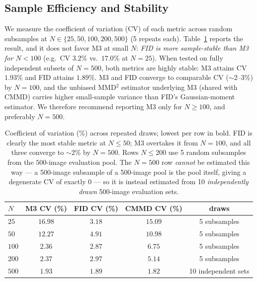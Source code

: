 \documentclass[lettersize,journal]{IEEEtran}
\begin{document}
\subsection{Sample Efficiency and Stability}
\label{sec:results_cv}

We measure the coefficient of variation (CV) of each metric across random
subsamples at $N \in \{25, 50, 100, 200, 500\}$ (5 repeats each).
Table~\ref{tab:cv} reports the result, and it does not favor M3 at small
$N$: \emph{FID is more sample-stable than M3 for $N < 100$} (e.g.\ CV
$3.2\%$ vs.\ $17.0\%$ at $N = 25$). When tested on fully independent subsets
of $N=500$, both metrics are highly stable: M3 attains CV $1.93\%$ and FID attains $1.89\%$.
M3 and FID converge to comparable CV
($\sim$2--3\%) by $N = 100$, and the unbiased MMD$^2$ estimator
underlying M3 (shared with CMMD) carries higher small-sample variance than
FID's Gaussian-moment estimator. We therefore recommend reporting M3 only
for $N \geq 100$, and preferably $N = 500$.

\begin{table}[t]
\centering
\caption{%
  Coefficient of variation (\%) across repeated draws; lowest per row in bold.
  FID is clearly the most stable metric at $N \le 50$; M3 overtakes it from
  $N = 100$, and all three converge to $\sim$2\% by $N = 500$.
  Rows $N \le 200$ use 5 random subsamples from the
  $500$-image evaluation pool. The $N = 500$ row \emph{cannot} be estimated this
  way --- a 500-image subsample of a 500-image pool is the pool itself, giving a
  degenerate CV of exactly $0$ --- so it is instead estimated from 10
  \emph{independently drawn} 500-image evaluation sets.
}
\label{tab:cv}
\begin{tabular}{lcccc}
\toprule
$N$ & M3 CV (\%) & FID CV (\%) & CMMD CV (\%) & draws \\
\midrule
$25$  & $16.98$ & $\mathbf{3.18}$ & $15.09$ & 5 subsamples \\
$50$  & $12.27$ & $\mathbf{4.91}$ & $10.98$ & 5 subsamples \\
$100$ & $\mathbf{2.36}$ & $2.87$ & $6.75$ & 5 subsamples \\
$200$ & $\mathbf{2.37}$ & $2.97$ & $5.14$ & 5 subsamples \\
$500$ & $1.93$  & $1.89$ & $\mathbf{1.82}$  & 10 independent sets \\
\bottomrule
\end{tabular}
\end{table}
\end{document}
